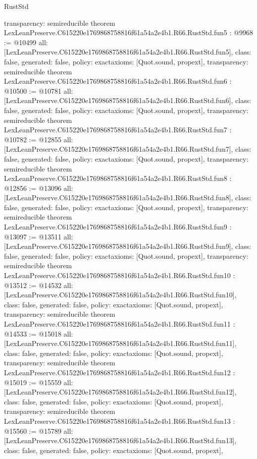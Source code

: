 \begin{lexlean}{RustStd}
\begin{coremodule}
{  transparency: semireducible
}
theorem LexLeanPreserve.C615220e1769868758816f61a54a2e4b1.R66.RustStd.fun5 : @9968 := @10499 {
  all: [LexLeanPreserve.C615220e1769868758816f61a54a2e4b1.R66.RustStd.fun5],
  class: false,
  generated: false,
  policy: exact{axioms: [Quot.sound, propext]},
  transparency: semireducible
}
theorem LexLeanPreserve.C615220e1769868758816f61a54a2e4b1.R66.RustStd.fun6 : @10500 := @10781 {
  all: [LexLeanPreserve.C615220e1769868758816f61a54a2e4b1.R66.RustStd.fun6],
  class: false,
  generated: false,
  policy: exact{axioms: [Quot.sound, propext]},
  transparency: semireducible
}
theorem LexLeanPreserve.C615220e1769868758816f61a54a2e4b1.R66.RustStd.fun7 : @10782 := @12855 {
  all: [LexLeanPreserve.C615220e1769868758816f61a54a2e4b1.R66.RustStd.fun7],
  class: false,
  generated: false,
  policy: exact{axioms: [Quot.sound, propext]},
  transparency: semireducible
}
theorem LexLeanPreserve.C615220e1769868758816f61a54a2e4b1.R66.RustStd.fun8 : @12856 := @13096 {
  all: [LexLeanPreserve.C615220e1769868758816f61a54a2e4b1.R66.RustStd.fun8],
  class: false,
  generated: false,
  policy: exact{axioms: [Quot.sound, propext]},
  transparency: semireducible
}
theorem LexLeanPreserve.C615220e1769868758816f61a54a2e4b1.R66.RustStd.fun9 : @13097 := @13511 {
  all: [LexLeanPreserve.C615220e1769868758816f61a54a2e4b1.R66.RustStd.fun9],
  class: false,
  generated: false,
  policy: exact{axioms: [Quot.sound, propext]},
  transparency: semireducible
}
theorem LexLeanPreserve.C615220e1769868758816f61a54a2e4b1.R66.RustStd.fun10 : @13512 := @14532 {
  all: [LexLeanPreserve.C615220e1769868758816f61a54a2e4b1.R66.RustStd.fun10],
  class: false,
  generated: false,
  policy: exact{axioms: [Quot.sound, propext]},
  transparency: semireducible
}
theorem LexLeanPreserve.C615220e1769868758816f61a54a2e4b1.R66.RustStd.fun11 : @14533 := @15018 {
  all: [LexLeanPreserve.C615220e1769868758816f61a54a2e4b1.R66.RustStd.fun11],
  class: false,
  generated: false,
  policy: exact{axioms: [Quot.sound, propext]},
  transparency: semireducible
}
theorem LexLeanPreserve.C615220e1769868758816f61a54a2e4b1.R66.RustStd.fun12 : @15019 := @15559 {
  all: [LexLeanPreserve.C615220e1769868758816f61a54a2e4b1.R66.RustStd.fun12],
  class: false,
  generated: false,
  policy: exact{axioms: [Quot.sound, propext]},
  transparency: semireducible
}
theorem LexLeanPreserve.C615220e1769868758816f61a54a2e4b1.R66.RustStd.fun13 : @15560 := @15789 {
  all: [LexLeanPreserve.C615220e1769868758816f61a54a2e4b1.R66.RustStd.fun13],
  class: false,
  generated: false,
  policy: exact{axioms: [Quot.sound, propext]},
}
\end{coremodule}
\end{lexlean}
